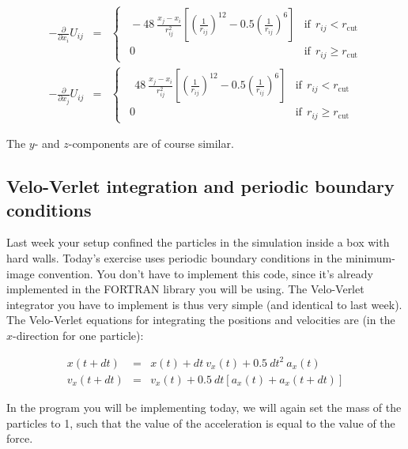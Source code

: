 \documentclass{article}
\begin{document}
\begin{eqnarray}
    -\frac{\partial}{\partial x_i} U_{ij}&=& 
    \begin{cases}
        \ \ -48\ \frac{x_j - x_i}{r^2_{ij}}
        \left[ \left(\frac{1}{r_{ij}} \right)^{12} - 0.5 \left(\frac{1}{r_{ij}} \right)^6 \right]
        & \mathrm{if}\ \ r_{ij} < r_{\mathrm{cut}} \\
        \ \ 0 & \mathrm{if}\ \ r_{ij} \ge  r_{\mathrm{cut}}
    \end{cases}\label{eq:force_i}\\
    -\frac{\partial}{\partial x_j} U_{ij}&=&
    \begin{cases}
        \ \ \ \ 48\ \frac{x_j - x_i}{r^2_{ij}}
        \left[ \left(\frac{1}{r_{ij}} \right)^{12} - 0.5 \left(\frac{1}{r_{ij}} \right)^6 \right]
        & \mathrm{if}\ \ r_{ij} < r_{\mathrm{cut}} \\
        \ \ 0 & \mathrm{if}\ \ r_{ij} \ge  r_{\mathrm{cut}}
    \end{cases}\label{eq:force_j}
\end{eqnarray}

The $y$- and $z$-components are of course similar.

\subsection{Velo-Verlet integration and periodic boundary conditions}

Last week your setup confined the particles in the simulation inside a box with
hard walls. Today's exercise uses periodic boundary conditions in the
minimum-image convention.
You don't have to implement this code, since it's already implemented in the FORTRAN library you
will be using. The Velo-Verlet integrator you have to implement is thus very
simple (and identical to last week).
The Velo-Verlet equations for integrating the positions and velocities are (in
the $x$-direction for one particle):

\begin{eqnarray}
x(t + dt) &=& x(t) + dt\ v_x(t) + 0.5\ dt^2\ a_x(t)\label{eq:position_x}\\
v_x(t + dt) &=& v_x(t) + 0.5\ dt \left[a_x(t) + a_x(t+dt)\right]\label{eq:speed_x}
\end{eqnarray}

In the program you will be implementing today, we will again set the mass of the particles
to 1, such that the value of the acceleration is equal to the value of the force.\\
\end{document}
